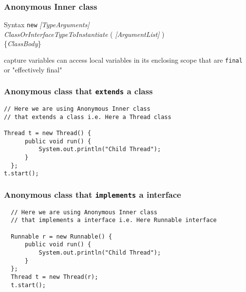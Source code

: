 \documentclass{beamer}
\begin{document}
\begin{frame}[fragile]
\frametitle{Anonymous Inner class}

\begin{block}{Syntax}
\texttt{new} \textit{[TypeArguments]} \\ 
\hspace{6mm} \textit{ClassOrInterfaceTypeToInstantiate} ( \textit{[ArgumentList]} ) \\
\hspace{6mm} \{\textit{ClassBody}\}
\end{block}
\pause
\begin{block} {capture variables}
can access local variables in its enclosing scope that are \texttt{final} or "effectively final"
\end{block}

\end{frame}


\begin{frame}[fragile]
\frametitle{Anonymous class that \texttt{extends} a class}

\begin{example}
    \begin{lstlisting}
// Here we are using Anonymous Inner class 
// that extends a class i.e. Here a Thread class 

Thread t = new Thread() { 
      public void run() { 
          System.out.println("Child Thread"); 
      } 
  }; 
t.start(); 

\end{lstlisting}
\end{example}

\end{frame}


\begin{frame}[fragile]
\frametitle{Anonymous class that \texttt{implements} a interface}

\begin{example}
    \begin{lstlisting}
  // Here we are using Anonymous Inner class 
  // that implements a interface i.e. Here Runnable interface

  Runnable r = new Runnable() { 
      public void run() { 
          System.out.println("Child Thread"); 
      }
  };
  Thread t = new Thread(r); 
  t.start();  

  \end{lstlisting}
\end{example}
\end{frame}
\end{document}
